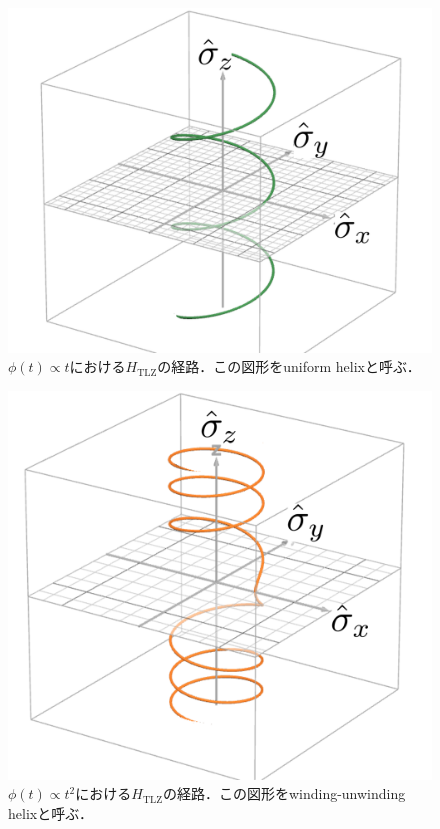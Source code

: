 \documentclass[a4paper, titlepage]{jsreport}
\begin{document}
\begin{figure}[htbp]
  \centering
  \includegraphics[scale=0.8]{figures/uniform_helix.png}
  \caption{$\phi(t) \propto t$における$H_{\mathrm{TLZ}}$の経路．この図形をuniform helixと呼ぶ．}
  \label{fig:uniform_helix}
\end{figure}

\begin{figure}[htbp]
  \centering
  \includegraphics[scale=0.8]{figures/winding_helix.png}
  \caption{$\phi(t) \propto t^2$における$H_{\mathrm{TLZ}}$の経路．この図形をwinding-unwinding helixと呼ぶ．}
  \label{fig:winding_helix}
\end{figure}
\end{document}
